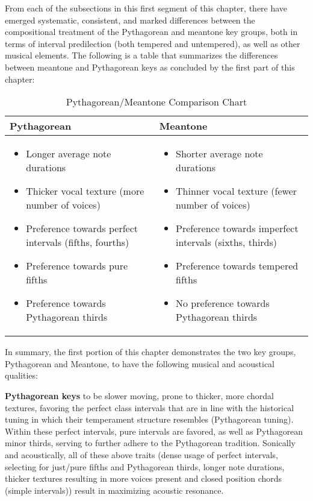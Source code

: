 From each of the subsections in this first segment of this chapter,
there have emerged systematic, consistent, and marked differences
between the compositional treatment of the Pythagorean and meantone key
groups, both in terms of interval predilection (both tempered and
untempered), as well as other musical elements. The following is a table
that summarizes the differences between meantone and Pythagorean keys as
concluded by the first part of this chapter:
\begin{table}[H]
\begin{singlespace}
\small
\centering
\begin{tabularx}{\textwidth}{|>{\RaggedRight}X|>{\RaggedRight}X|}
\hline
\textbf{Pythagorean} & \textbf{Meantone} \\
\hline
\vspace{-1em}
\begin{itemize}[leftmargin=*]
    \item Longer average note durations
    \item Thicker vocal texture (more number of voices)
    \item Preference towards perfect intervals (fifths, fourths)
    \item Preference towards pure fifths
    \item Preference towards Pythagorean thirds
\end{itemize}
&
\vspace{-1em}
\begin{itemize}[leftmargin=*]
    \item Shorter average note durations
    \item Thinner vocal texture (fewer number of voices)
    \item Preference towards imperfect intervals (sixths, thirds)
    \item Preference towards tempered fifths
    \item No preference towards Pythagorean thirds
\end{itemize}
\\

\hline
\end{tabularx}
\small
\end{singlespace}
\caption{Pythagorean/Meantone Comparison Chart}
\end{table}
    In summary, the first portion of this chapter demonstrates the two key
groups, Pythagorean and Meantone, to have the following musical and
acoustical qualities:

\textbf{Pythagorean keys} to be slower moving, prone to thicker, more
chordal textures, favoring the perfect class intervals that are in line
with the historical tuning in which their temperament structure
resembles (Pythagorean tuning). Within these perfect intervals, pure
intervals are favored, as well as Pythagorean minor thirds, serving to
further adhere to the Pythagorean tradition. Sonically and acoustically,
all of these above traits (dense usage of perfect intervals, selecting
for just/pure fifths and Pythagorean thirds, longer note durations,
thicker textures resulting in more voices present and closed position
chords (simple intervals)) result in maximizing acoustic resonance.

